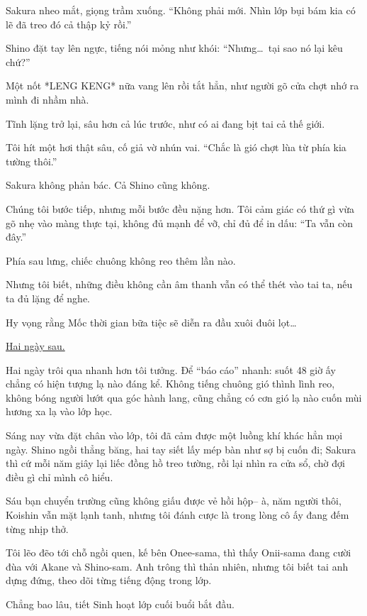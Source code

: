 \documentclass[../main.tex]{subfiles}
\begin{document}
Sakura nheo mắt, giọng trầm xuống. ``Không phải mới. Nhìn lớp bụi bám kia có lẽ đã treo đó cả thập kỷ rồi.''

Shino đặt tay lên ngực, tiếng nói mỏng như khói: ``Nhưng\dots\ tại sao nó lại kêu chứ?''

Một nốt *LENG KENG* nữa vang lên rồi tắt hẳn, như người gõ cửa chợt nhớ ra mình đi nhầm nhà.

Tĩnh lặng trở lại, sâu hơn cả lúc trước, như có ai đang bịt tai cả thế giới.

Tôi hít một hơi thật sâu, cố giả vờ nhún vai. ``Chắc là gió chợt lùa từ phía kia tường thôi.''

Sakura không phản bác. Cả Shino cũng không.

Chúng tôi bước tiếp, nhưng mỗi bước đều nặng hơn. Tôi cảm giác có thứ gì vừa gõ nhẹ vào màng thực tại, không đủ mạnh để vỡ, chỉ đủ để in dấu: ``Ta vẫn còn đây.''

Phía sau lưng, chiếc chuông không reo thêm lần nào.

Nhưng tôi biết, những điều không cần âm thanh vẫn có thể thét vào tai ta, nếu ta đủ lặng để nghe.

Hy vọng rằng Mốc thời gian bữa tiệc sẽ diễn ra đầu xuôi đuôi lọt\dots

\begin{center}
  \uline{Hai ngày sau.}
\end{center}

Hai ngày trôi qua nhanh hơn tôi tưởng. Để ``báo cáo'' nhanh: suốt 48 giờ ấy chẳng có hiện tượng lạ nào đáng kể. Không tiếng chuông gió thình lình reo, không bóng người lướt qua góc hành lang, cũng chẳng có cơn gió lạ nào cuốn mùi hương xa lạ vào lớp học.

Sáng nay vừa đặt chân vào lớp, tôi đã cảm được một luồng khí khác hẳn mọi ngày. Shino ngồi thẳng băng, hai tay siết lấy mép bàn như sợ bị cuốn đi; Sakura thì cứ mỗi năm giây lại liếc đồng hồ treo tường, rồi lại nhìn ra cửa sổ, chờ đợi điều gì chỉ mình cô hiểu.

Sáu bạn chuyển trường cũng không giấu được vẻ hồi hộp-- à, năm người thôi, Koishin vẫn mặt lạnh tanh, nhưng tôi đánh cược là trong lòng cô ấy đang đếm từng nhịp thở.

Tôi lẽo đẽo tới chỗ ngồi quen, kế bên Onee-sama, thì thấy Onii-sama đang cười đùa với Akane và Shino-sam. Anh trông thì thản nhiên, nhưng tôi biết tai anh dựng đứng, theo dõi từng tiếng động trong lớp.

Chẳng bao lâu, tiết Sinh hoạt lớp cuối buổi bắt đầu.
\end{document}
